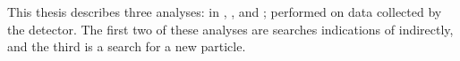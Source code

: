 This thesis describes three analyses: in , , and ;
performed on data collected by the \lhcb detector.
The first two of these analyses are searches indications of \np indirectly, and the third is a
search for a new particle.




\clearpage





%
%
%
